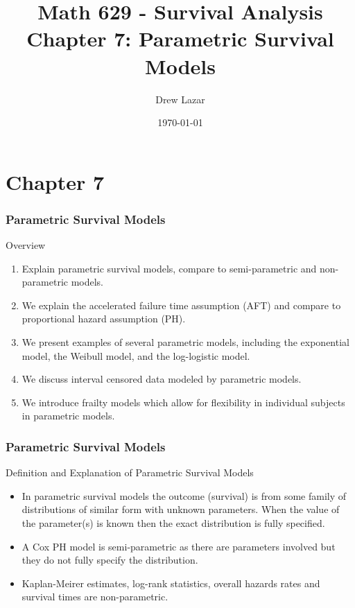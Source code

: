 \documentclass{beamer}
\title{Math 629 - Survival Analysis \\ Chapter 7: Parametric Survival Models  
}
\author{Drew Lazar}
\institute{Ball State University}
\date{\today}
\theoremstyle{definition}
\begin{document}
\begin{frame}
    \titlepage
\end{frame}



\section{Chapter 7}
\begin{frame}
\frametitle{Parametric Survival Models}
\begin{block}{Overview}
\begin{enumerate}
\item Explain parametric survival models, compare to semi-parametric and non-parametric models.  
\item We explain the accelerated failure time assumption (AFT) and compare to proportional hazard assumption (PH).
\item We present examples of several parametric models, including the exponential model, the Weibull model, and the
log-logistic model.
\item We discuss interval censored data modeled by parametric models. 
\item We introduce frailty models which allow for flexibility in individual subjects in parametric models. 
\end{enumerate}
\end{block}  
\end{frame}

\begin{frame}
\frametitle{Parametric Survival Models}
\begin{block}{Definition and Explanation of Parametric Survival Models}
\begin{itemize}
\item In parametric survival models the outcome (survival) is from some family of
distributions of similar form with unknown parameters. When the value of the parameter(s) is known then the exact distribution
is fully specified.
\item A Cox PH model is semi-parametric as there are parameters involved but they do not fully specify the distribution. 
\item Kaplan-Meirer estimates, log-rank statistics, overall hazards rates and survival times are non-parametric. 
\end{itemize} 
\end{block} 
\end{frame}
\end{document}
